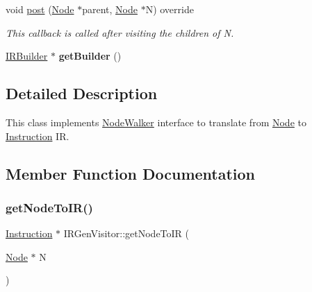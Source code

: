 \begin{DoxyCompactItemize}
\item 
\mbox{\label{classglow_1_1_i_r_gen_visitor_a2791ce4591f8edb1a38a89bf1f764867}} 
void \hyperlink{classglow_1_1_i_r_gen_visitor_a2791ce4591f8edb1a38a89bf1f764867}{post} (\hyperlink{classglow_1_1_node}{Node} $\ast$parent, \hyperlink{classglow_1_1_node}{Node} $\ast$N) override
\begin{DoxyCompactList}\small\item\em This callback is called after visiting the children of {\ttfamily N}. \end{DoxyCompactList}\item 
\mbox{\label{classglow_1_1_i_r_gen_visitor_a9061ec8ffd134283efab72ec5bc1fab1}} 
\hyperlink{classglow_1_1_i_r_builder}{I\+R\+Builder} $\ast$ {\bfseries get\+Builder} ()
\end{DoxyCompactItemize}


\subsection{Detailed Description}
This class implements {\ttfamily \hyperlink{classglow_1_1_node_walker}{Node\+Walker}} interface to translate from \hyperlink{classglow_1_1_node}{Node} to \hyperlink{classglow_1_1_instruction}{Instruction} IR. 

\subsection{Member Function Documentation}
\mbox{\label{classglow_1_1_i_r_gen_visitor_a53d9ffcdda8b598a40e95d139dc83f06}} 
\subsubsection{\texorpdfstring{get\+Node\+To\+I\+R()}{getNodeToIR()}}
{\footnotesize\ttfamily \hyperlink{classglow_1_1_instruction}{Instruction} $\ast$ I\+R\+Gen\+Visitor\+::get\+Node\+To\+IR (\begin{DoxyParamCaption}\item[{\hyperlink{classglow_1_1_node}{Node} $\ast$}]{N }\end{DoxyParamCaption})}


